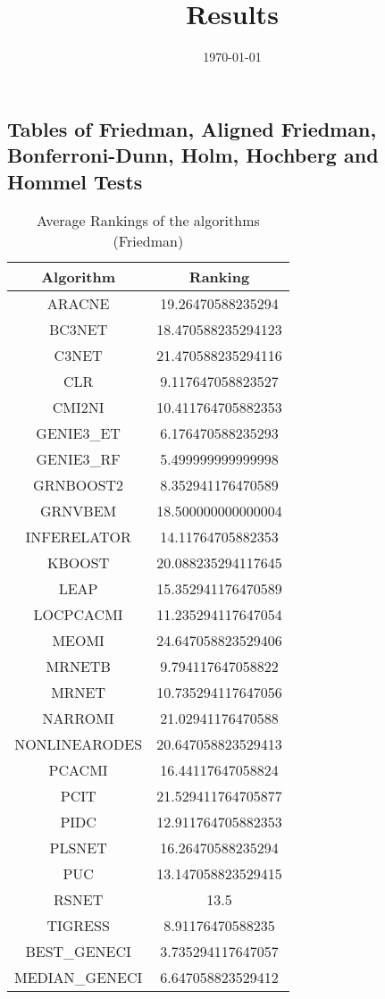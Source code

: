 \documentclass[a4paper,10pt]{article}
\title{Results}
\author{}
\date{\today}
\begin{document}
\begin{landscape}
\oddsidemargin 0in \topmargin 0in\maketitle
\section{Tables of Friedman, Aligned Friedman, Bonferroni-Dunn, Holm, Hochberg and Hommel Tests}
\begin{table}[!htp]
\centering
\caption{Average Rankings of the algorithms (Friedman)
}\begin{tabular}{c|c}
Algorithm&Ranking\\
\hline
ARACNE&19.26470588235294\\
BC3NET&18.470588235294123\\
C3NET&21.470588235294116\\
CLR&9.117647058823527\\
CMI2NI&10.411764705882353\\
GENIE3_ET&6.176470588235293\\
GENIE3_RF&5.499999999999998\\
GRNBOOST2&8.352941176470589\\
GRNVBEM&18.500000000000004\\
INFERELATOR&14.11764705882353\\
KBOOST&20.088235294117645\\
LEAP&15.352941176470589\\
LOCPCACMI&11.235294117647054\\
MEOMI&24.647058823529406\\
MRNETB&9.794117647058822\\
MRNET&10.735294117647056\\
NARROMI&21.02941176470588\\
NONLINEARODES&20.647058823529413\\
PCACMI&16.44117647058824\\
PCIT&21.529411764705877\\
PIDC&12.911764705882353\\
PLSNET&16.26470588235294\\
PUC&13.147058823529415\\
RSNET&13.5\\
TIGRESS&8.91176470588235\\
BEST_GENECI&3.735294117647057\\
MEDIAN_GENECI&6.647058823529412\\
\end{tabular}
\end{table}



\end{landscape}
\end{document}
